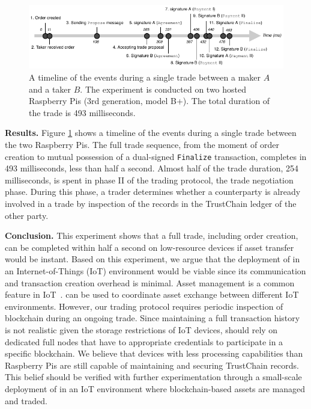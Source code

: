\begin{figure}[t]
	\centering
	\includegraphics[width=\linewidth]{xchange/assets/trade_timeline}
	\caption{A timeline of the events during a single trade between a maker $ A $ and a taker $ B $. The experiment is conducted on two hosted Raspberry Pis (3rd generation, model B+). The total duration of the trade is 493 milliseconds.}
	\label{fig:trade_timeline}
\end{figure}

\textbf{Results.}
Figure \ref{fig:trade_timeline} shows a timeline of the events during a single trade between the two Raspberry Pis.
The full trade sequence, from the moment of order creation to mutual possession of a dual-signed \texttt{Finalize} transaction, completes in 493 milliseconds, less than half a second.
Almost half of the trade duration, 254 milliseconds, is spent in phase II of the \ModelName{} trading protocol, the trade negotiation phase.
During this phase, a trader determines whether a counterparty is already involved in a trade by inspection of the records in the TrustChain ledger of the other party.

\textbf{Conclusion.}
This experiment shows that a full trade, including order creation, can be completed within half a second on low-resource devices if asset transfer would be instant.
Based on this experiment, we argue that the deployment of \ModelName{} in an Internet-of-Things (IoT) environment would be viable since its communication and transaction creation overhead is minimal.
Asset management is a common feature in IoT~\cite{gilchrist2016industry}.
\ModelName{} can be used to coordinate asset exchange between different IoT environments.
However, our trading protocol requires periodic inspection of blockchain during an ongoing trade.
Since maintaining a full transaction history is not realistic given the storage restrictions of IoT devices, \ModelName{} should rely on dedicated full nodes that have to appropriate credentials to participate in a specific blockchain.
We believe that devices with less processing capabilities than Raspberry Pis are still capable of maintaining and securing TrustChain records.
This belief should be verified with further experimentation through a small-scale deployment of \ModelName{} in an IoT environment where blockchain-based assets are managed and traded.

